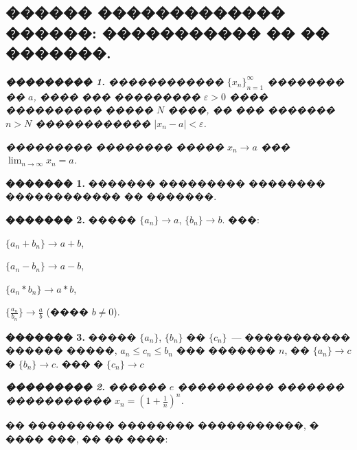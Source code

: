 \documentclass[a4paper,12pt]{article}
\begin{document}
\newpage

\begin{center}
\section*{������ ������������� ������: ����������� �� �� �������.}
\end{center}

\quad \textit{\textbf{��������� 1.}} \textit{������������ $\{x_{n}\}_{n=1}^{\infty}$ �������� �� $a$, ���� ��� ��������� $\varepsilon>0$ ���� ���������� ����� $N$ ����, �� ��� ������� $n>N$ ������������ $|x_{n}-a|<\varepsilon$. }

\textit{��������� �������� ����� $x_{n}\rightarrow a$ ��� $\lim_{n\rightarrow \infty}^{}x_{n}=a$.}

\textbf{������� 1.} ������� ��������� �������� ������������ �� �������.

\textbf{������� 2.} ����� $\{a_{n}\}\rightarrow a$, $\{b_{n}\}\rightarrow b$. ���:

$\{a_{n}+b_{n}\}\rightarrow a+b$,

$\{a_{n}-b_{n}\}\rightarrow a-b$,

$\{a_{n}*b_{n}\}\rightarrow a*b$,

$\{\frac{a_{n}}{b_{n}}\}\rightarrow \frac{a}{b}$ (���� $b\neq 0$).

\textbf{������� 3.} ����� $\{a_{n}\}$, $\{b_{n}\}$ �� $\{c_{n}\}$~--- ����������� ������ �����, $a_{n}\leq c_{n}\leq b_{n}$ ��� ������� $n$, �� $\{a_{n}\}\rightarrow c$ � $\{b_{n}\}\rightarrow c$. ��� � $\{c_{n}\}\rightarrow c$

\textit{\textbf{��������� 2.}} \textit{������ $e$ ���������� ������� ����������� $x_{n}=(1+\frac{1}{n})^{n}$.}

\medskip\medskip\medskip

�� ��������� �������� �����������, � ���� ���, �� �� ����:
\end{document}
